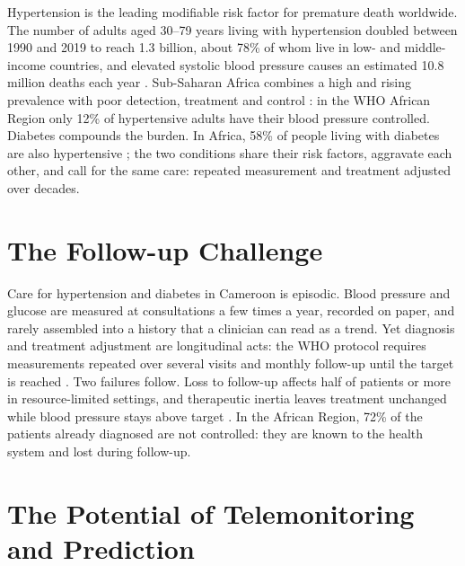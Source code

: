 \label{ch:intro}

Hypertension is the leading modifiable risk factor for premature death worldwide. The number of adults aged 30--79 years living with hypertension doubled between 1990 and 2019 to reach 1.3 billion, about 78\% of whom live in low- and middle-income countries, and elevated systolic blood pressure causes an estimated 10.8 million deaths each year \parencite{who2023hypertension}. Sub-Saharan Africa combines a high and rising prevalence with poor detection, treatment and control \parencite{gafane2024}: in the WHO African Region only 12\% of hypertensive adults have their blood pressure controlled. Diabetes compounds the burden. In Africa, 58\% of people living with diabetes are also hypertensive \parencite{hinneh2023}; the two conditions share their risk factors, aggravate each other, and call for the same care: repeated measurement and treatment adjusted over decades.

\section*{The Follow-up Challenge}

Care for hypertension and diabetes in Cameroon is episodic. Blood pressure and glucose are measured at consultations a few times a year, recorded on paper, and rarely assembled into a history that a clinician can read as a trend. Yet diagnosis and treatment adjustment are longitudinal acts: the WHO protocol requires measurements repeated over several visits and monthly follow-up until the target is reached \parencite{who2021guideline,who2023hypertension}. Two failures follow. Loss to follow-up affects half of patients or more in resource-limited settings, and therapeutic inertia leaves treatment unchanged while blood pressure stays above target \parencite{who2023hypertension}. In the African Region, 72\% of the patients already diagnosed are not controlled: they are known to the health system and lost during follow-up.

\section*{The Potential of Telemonitoring and Prediction}

